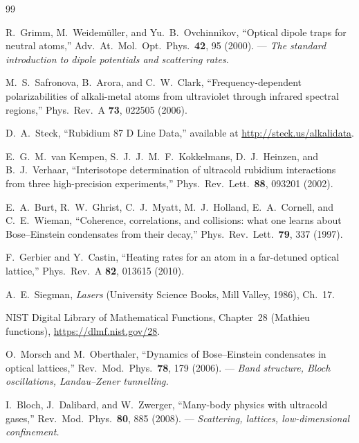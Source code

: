 \documentclass[11pt,a4paper]{article}
\begin{document}
\begin{thebibliography}{99}
\small

 R.~Grimm, M.~Weidemüller, and Yu.~B.~Ovchinnikov, ``Optical dipole traps for neutral atoms,'' Adv.\ At.\ Mol.\ Opt.\ Phys.\ \textbf{42}, 95 (2000). --- \emph{The standard introduction to dipole potentials and scattering rates.}

 M.~S.~Safronova, B.~Arora, and C.~W.~Clark, ``Frequency-dependent polarizabilities of alkali-metal atoms from ultraviolet through infrared spectral regions,'' Phys.\ Rev.\ A \textbf{73}, 022505 (2006).

 D.~A.~Steck, ``Rubidium 87 D Line Data,'' available at \url{http://steck.us/alkalidata}.

 E.~G.~M.~van Kempen, S.~J.~J.~M.~F.~Kokkelmans, D.~J.~Heinzen, and B.~J.~Verhaar, ``Interisotope determination of ultracold rubidium interactions from three high-precision experiments,'' Phys.\ Rev.\ Lett.\ \textbf{88}, 093201 (2002).

 E.~A.~Burt, R.~W.~Ghrist, C.~J.~Myatt, M.~J.~Holland, E.~A.~Cornell, and C.~E.~Wieman, ``Coherence, correlations, and collisions: what one learns about Bose--Einstein condensates from their decay,'' Phys.\ Rev.\ Lett.\ \textbf{79}, 337 (1997).

 F.~Gerbier and Y.~Castin, ``Heating rates for an atom in a far-detuned optical lattice,'' Phys.\ Rev.\ A \textbf{82}, 013615 (2010).

 A.~E.~Siegman, \emph{Lasers} (University Science Books, Mill Valley, 1986), Ch.~17.

 NIST Digital Library of Mathematical Functions, Chapter~28 (Mathieu functions), \url{https://dlmf.nist.gov/28}.

 O.~Morsch and M.~Oberthaler, ``Dynamics of Bose--Einstein condensates in optical lattices,'' Rev.\ Mod.\ Phys.\ \textbf{78}, 179 (2006). --- \emph{Band structure, Bloch oscillations, Landau--Zener tunnelling.}

 I.~Bloch, J.~Dalibard, and W.~Zwerger, ``Many-body physics with ultracold gases,'' Rev.\ Mod.\ Phys.\ \textbf{80}, 885 (2008). --- \emph{Scattering, lattices, low-dimensional confinement.}


\end{thebibliography}
\end{document}
